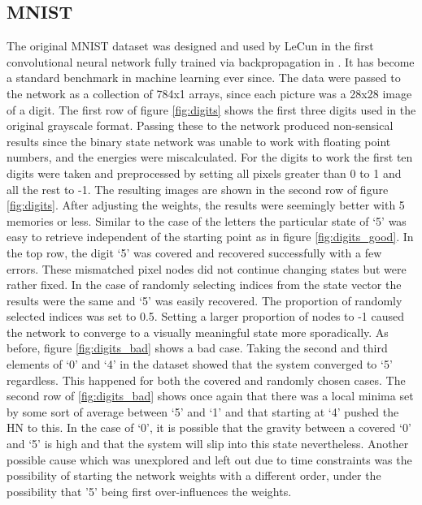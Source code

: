 \documentclass[11pt]{article}
\begin{document}
	\subsection{MNIST}
	The original MNIST dataset was designed and used by LeCun in the first convolutional neural network fully trained via backpropagation in \cite{lecun1989}.
	It has become a standard benchmark in machine learning ever since. 
	The data were passed to the network as a collection of 784x1 arrays, since each picture was a 28x28 image of a digit. 
	The first row of figure \ref{fig:digits} shows the first three digits used in the original grayscale format. 
	Passing these to the network produced non-sensical results since the binary state network was unable to work with floating point numbers, and the energies were miscalculated.
	For the digits to work the first ten digits were taken and preprocessed by setting all pixels greater than 0 to 1 and all the rest to -1. The resulting images are shown in the second row of figure \ref{fig:digits}.
	After adjusting the weights,  the results were seemingly better with 5 memories or less.
	Similar to the case of the letters the particular state of `5' was easy to retrieve independent of the starting point as in figure \ref{fig:digits_good}.
	In the top row, the digit `5' was covered and recovered successfully with a few errors.
	These mismatched pixel nodes did not continue changing states but were rather fixed.
	In the case of randomly selecting indices from the state vector the results were the same and `5' was easily recovered.
	The proportion of randomly selected indices was set to 0.5. 
	Setting a larger proportion of nodes to -1 caused the network to converge to a visually meaningful state more sporadically.
	As before, figure \ref{fig:digits_bad} shows a bad case. Taking the second and third elements of `0' and `4' in the dataset showed that the system converged to `5' regardless.
	This happened for both the  covered and randomly chosen cases. 
	The second row of  \ref{fig:digits_bad}  shows once again that there was a local minima set by some sort of average between `5' and `1' and that starting at `4' pushed the HN to this.
	In the case of `0', it is possible that the gravity between a covered `0' and `5' is high and that the system will slip into this state nevertheless.
	Another possible cause which was unexplored and left out due to time constraints was the possibility of starting the network weights with a different order, under the possibility that '5' being first over-influences the weights.
	
\end{document}
